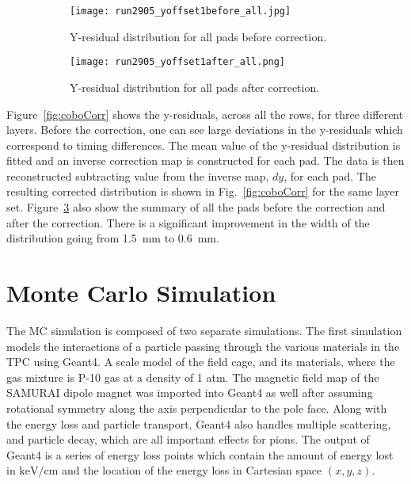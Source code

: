 \begin{figure}[!htb]
    \begin{subfigure}[t]{.49\textwidth}
        \centering
        \texttt{[image: run2905\_yoffset1before\_all.jpg]} 
        \caption{Y-residual distribution for all pads before correction.} \label{fig:yoff_allBefore}
    \end{subfigure}
    \hfill
    \begin{subfigure}[t]{.49\textwidth}
        \centering
        \texttt{[image: run2905\_yoffset1after\_all.png]}
        \caption{Y-residual distribution for all pads after correction.} \label{fig:yoff_allAfter}
    \end{subfigure}
    \caption{ }
\label{fig:yoff}
\end{figure}


 Figure~\ref{fig:coboCorr} shows the y-residuals, across all the rows, for three different layers. Before the correction, one can see large deviations in the y-residuals which correspond to timing differences. The mean value of the y-residual distribution is fitted and an inverse correction map is constructed for each pad. The data is then reconstructed subtracting value from the inverse map, $dy$, for each pad. The resulting corrected distribution is shown in Fig.~\ref{fig:coboCorr} for the same layer set. Figure~\ref{fig:yoff} also show the summary of all the pads before the correction and after the correction. There is a significant improvement in the width of the distribution going from \SI{1.5}{\milli\metre} to \SI{0.6}{\milli\metre}. 






\section{Monte Carlo Simulation}
The MC simulation is composed of two separate simulations. The first simulation models the interactions of a particle passing through the various materials in the TPC using Geant4. A scale model of the field cage, and its materials, where the gas mixture is P-10 gas at a density of 1 atm. The magnetic field map of the SAMURAI dipole magnet was imported into Geant4 as well after assuming rotational symmetry along the axis perpendicular to the pole face. Along with the energy loss and particle transport, Geant4 also handles multiple scattering, and particle decay, which are all important effects for pions. The output of Geant4 is a series of energy loss points which contain the amount of energy lost in $\si{\kilo\electronvolt\per\centi\metre}$ and the location of the energy loss in Cartesian space $(x,y,z)$. 

